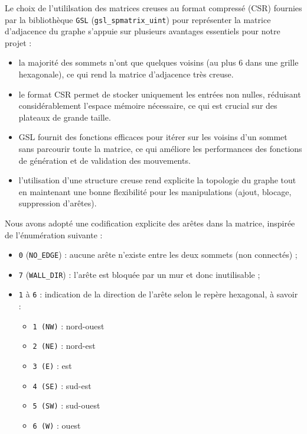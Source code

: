 Le choix de l'utililsation des matrices creuses au format compressé (CSR) fournies par la bibliothèque \texttt{GSL} (\texttt{gsl\_spmatrix\_uint}) pour représenter la matrice d’adjacence du graphe s’appuie sur plusieurs avantages essentiels pour notre projet :

\begin{itemize}
    \item la majorité des sommets n’ont que quelques voisins (au plus 6 dans une grille hexagonale), ce qui rend la matrice d’adjacence très creuse.
    \item le format CSR permet de stocker uniquement les entrées non nulles, réduisant considérablement l’espace mémoire nécessaire, ce qui est crucial sur des plateaux de grande taille.
    \item GSL fournit des fonctions efficaces pour itérer sur les voisins d’un sommet sans parcourir toute la matrice, ce qui améliore les performances des fonctions de génération et de validation des mouvements.
    \item l’utilisation d’une structure creuse rend explicite la topologie du graphe tout en maintenant une bonne flexibilité pour les manipulations (ajout, blocage, suppression d’arêtes).
\end{itemize}

Nous avons adopté une codification explicite des arêtes dans la matrice, inspirée de l’énumération suivante :

\begin{itemize}
    \item \texttt{0} (\texttt{NO\_EDGE}) : aucune arête n’existe entre les deux sommets (non connectés) ;
    \item \texttt{7} (\texttt{WALL\_DIR}) : l’arête est bloquée par un mur et donc inutilisable ;
    \item \texttt{1} à \texttt{6} : indication de la direction de l’arête selon le repère hexagonal, à savoir :
    \begin{itemize}
        \item \texttt{1 (NW)} : nord-ouest  
        \item \texttt{2 (NE)} : nord-est  
        \item \texttt{3 (E)}  : est  
        \item \texttt{4 (SE)} : sud-est  
        \item \texttt{5 (SW)} : sud-ouest  
        \item \texttt{6 (W)}  : ouest  
    \end{itemize}
\end{itemize}


